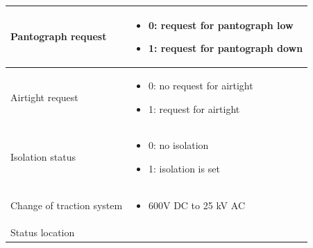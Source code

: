 \documentclass[nocc]{template/openetcs_report}
\begin{document}
\begin{longtable}{|l|l|}
				\begin{minipage}[t]{0.5\linewidth} Pantograph request	\end{minipage} 
				&	\begin{minipage}[t]{0.5\linewidth}
						\begin{itemize}
							\item 0: request for pantograph low
							\item 1: request for pantograph down
						\end{itemize}
					\end{minipage} \\
				\hline
				\begin{minipage}[t]{0.5\linewidth} Airtight request	\end{minipage} 
				&	\begin{minipage}[t]{0.5\linewidth}
						\begin{itemize}
							\item 0: no request for airtight
							\item 1: request for airtight
						\end{itemize}
					\end{minipage} \\
				\hline
				\begin{minipage}[t]{0.5\linewidth} Isolation status	\end{minipage} 
				&	\begin{minipage}[t]{0.5\linewidth}
						\begin{itemize}
							\item 0: no isolation
							\item 1: isolation is set
						\end{itemize}
					\end{minipage} \\
				\hline
				\begin{minipage}[t]{0.5\linewidth} Change of traction system	\end{minipage} 
				&	\begin{minipage}[t]{0.5\linewidth}
						\begin{itemize}
							\item 600V DC to 25 kV AC
						\end{itemize}
					\end{minipage} \\
				\hline
				\begin{minipage}[t]{0.5\linewidth} Status location	\end{minipage} 
				&	\begin{minipage}[t]{0.5\linewidth}

\end{minipage}
\end{longtable}
\end{document}
